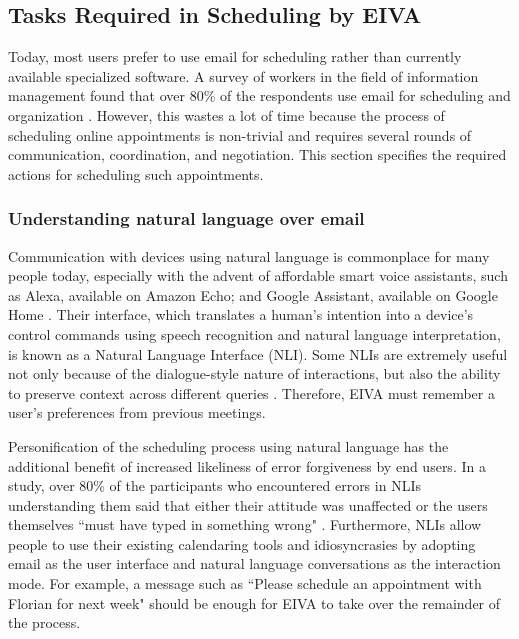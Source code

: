 \documentclass{article}
\begin{document}
\subsection{Tasks Required in Scheduling by EIVA}

Today, most users prefer to use email for scheduling rather than currently available specialized software. A survey of workers in the field of information management found that over 80\% of the respondents use email for scheduling and organization \cite{ducheneaut_e-mail_2001}. However, this wastes a lot of time because the process of scheduling online appointments is non-trivial and requires several rounds of communication, coordination, and negotiation. This section specifies the required actions for scheduling such appointments.

\subsubsection{Understanding natural language over email}

Communication with devices using natural language is commonplace for many people today, especially with the advent of affordable smart voice assistants, such as Alexa, available on Amazon Echo; and Google Assistant, available on Google Home \cite{de_barcelos_silva_intelligent_2020}. Their interface, which translates a human's intention into a device's control commands using speech recognition and natural language interpretation, is known as a Natural Language Interface (NLI). Some NLIs are extremely useful not only because of the dialogue-style nature of interactions, but also the ability to preserve context across different queries \cite{kiseleva_predicting_2016}. Therefore, EIVA must remember a user's preferences from previous meetings. 

Personification of the scheduling process using natural language has the additional benefit of increased likeliness of error forgiveness by end users. In a study, over 80\% of the participants who encountered errors in NLIs understanding them said that either their attitude was unaffected or the users themselves ``must have typed in something wrong" \cite{kelley_iterative_1984}. Furthermore, NLIs allow people to use their existing calendaring tools and idiosyncrasies by adopting email as the user interface and natural language conversations as the interaction mode. For example, a message such as ``Please schedule an appointment with Florian for next week" should be enough for EIVA to take over the remainder of the process.
\end{document}
